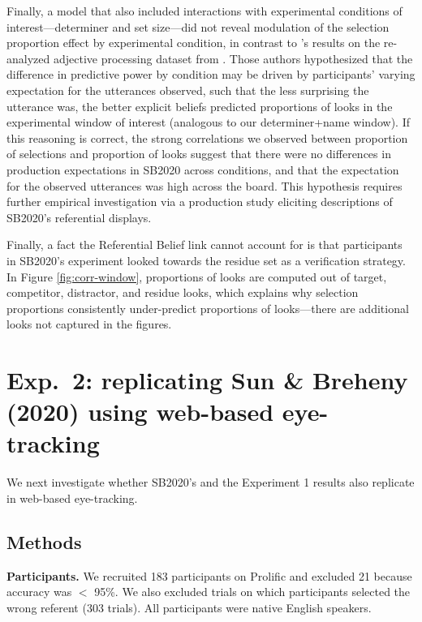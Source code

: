 \documentclass[10pt,letterpaper]{article}
\newcommand{\figref}[1]{Figure \ref{#1}}
\newcommand{\expref}[1]{Experiment #1}
\begin{document}
Finally, a model that also included interactions with experimental conditions of interest---determiner and set size---did not reveal modulation of the selection proportion effect by experimental condition, in contrast to 's results on the re-analyzed adjective processing dataset from . Those authors hypothesized that the difference in predictive power by condition may be driven by participants' varying expectation for the utterances observed, such that the less surprising the utterance was, the better explicit beliefs predicted proportions of looks in the experimental window of interest (analogous to our determiner+name window). If this reasoning is correct, the  strong correlations we observed between proportion of selections and proportion of looks suggest that there were no differences in production expectations in SB2020 across conditions, and that the expectation for the observed utterances was high across the board.  This hypothesis requires further empirical investigation via a production study eliciting descriptions of SB2020's referential displays.

Finally, a  fact the Referential Belief link cannot account for is  that participants in SB2020's experiment  looked towards the  residue set as a verification strategy. In \figref{fig:corr-window}, %
proportions of looks  are computed out of target, competitor, distractor, and residue looks, which explains why selection proportions consistently under-predict proportions of looks---there are additional looks not captured in the figures. 

\section{Exp.~2: replicating Sun \& Breheny (2020) using web-based eye-tracking}

We next investigate whether SB2020's and the \expref{1} results  also replicate in web-based eye-tracking.

\subsection{Methods}

\textbf{Participants.} We recruited 183 participants on Prolific and excluded 21  because  accuracy was $<$ 95\%. We also excluded trials on which participants selected the wrong referent (303 trials). All participants were native English speakers.
\end{document}
